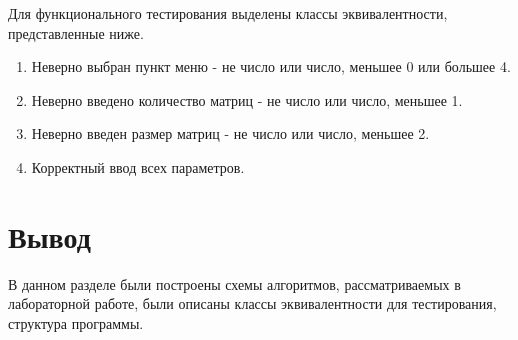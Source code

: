 Для функционального тестирования выделены классы эквивалентности, представленные ниже.

\begin{enumerate}
	\item Неверно выбран пункт меню - не число или число, меньшее 0 или большее 4.
	\item Неверно введено количество матриц - не число или число, меньшее 1.
	\item Неверно введен размер матриц - не число или число, меньшее 2.
	\item Корректный ввод всех параметров.
\end{enumerate}


\section{Вывод}

В данном разделе были построены схемы алгоритмов, рассматриваемых в лабораторной работе, были описаны классы эквивалентности для тестирования, структура программы.
